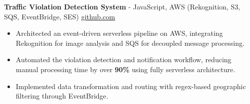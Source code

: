 \documentclass[11pt]{article}
\begin{document}
\textbf{Traffic Violation Detection System}{ - JavaScript, AWS (Rekognition, S3, SQS, EventBridge, SES)} \hfill \href{https://github.com/Monica20030707/AWS_rekonigition-N-read-database}{github.com}
\vspace{-9pt}
\begin{itemize}
  \item Architected an event-driven serverless pipeline on AWS, integrating Rekognition for image analysis and SQS for decoupled message processing.
  \item Automated the violation detection and notification workflow, reducing manual processing time by over \textbf{90\%} using fully serverless architecture.
  \item Implemented data transformation and routing with regex-based geographic filtering through EventBridge.
\end{itemize}

\end{document}
